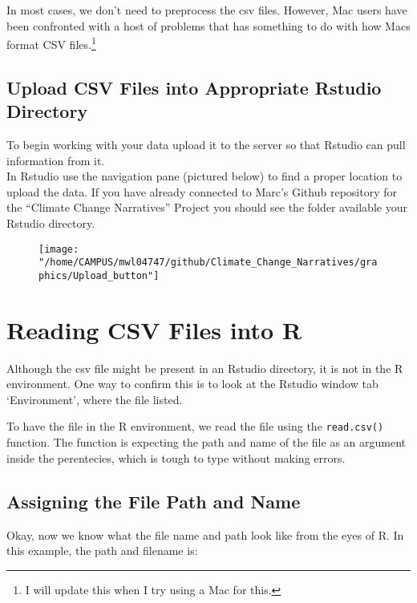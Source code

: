 \documentclass{article}\usepackage[]{graphicx}\usepackage[]{color}
\begin{document}
In most cases, we don't need to preprocess the csv files. However, Mac users have been confronted with a host of problems that has something to do with how Macs format CSV files.\footnote{I will update this when I try using a Mac for this.}

\subsection{Upload CSV Files into Appropriate Rstudio Directory} 

To begin working with your data upload it to the server so that Rstudio can pull information from it. \\
In Rstudio use the navigation pane (pictured below) to find a proper location to upload the data. If you have already connected to Marc's Github repository for the ``Climate Change Narratives'' Project you should see the folder available your Rstudio directory. 


\begin{figure}[h]
\texttt{[image: "/home/CAMPUS/mwl04747/github/Climate\_Change\_Narratives/graphics/Upload\_button"]}
\end{figure}


\section{Reading CSV Files into R}

Although the csv file might be present in an Rstudio directory, it is not in the R environment. One way to confirm this is to look at the Rstudio window tab `Environment', where the file listed. 

To have the file in the R environment, we read the file using the \verb!read.csv()! function. The function is expecting the path and name of the file as an argument inside the perentecies, which is tough to type without making errors. 

\subsection{Assigning the File Path and Name}

Okay, now we know what the file name and path look like from the eyes of R. In this example, the path and filename is:

\end{document}

